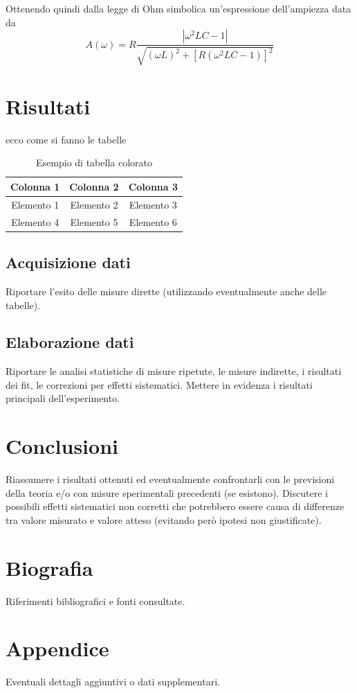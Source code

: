 \documentclass[12pt, letterpaper]{article}
\begin{document}
Ottenendo quindi dalla legge di Ohm simbolica un'espressione dell'ampiezza data da
\[
A(\omega)= R \frac{|\omega^2 LC -1|}{\sqrt{(\omega L)^2 + [R(\omega^2 LC -1)]^2}}
\]

\section{Risultati}

ecco come si fanno le tabelle

\begin{table}[htbp]
  \begin{tabular}{|c|c|c|}
    \hline
    Colonna 1 & Colonna 2 & Colonna 3 \\
    \hline
    Elemento 1 & Elemento 2 & Elemento 3 \\
    \hline
    Elemento 4 & Elemento 5 & Elemento 6 \\
    \hline
  \end{tabular}
   \textcolor{gray}{\caption{Esempio di tabella colorato }}
  \label{tab:esempio}
\end{table}

\subsection{Acquisizione dati}
Riportare l’esito delle misure dirette (utilizzando eventualmente anche
delle tabelle).

\subsection{Elaborazione dati}
Riportare le analisi statistiche di misure ripetute, le misure indirette, i
risultati dei fit, le correzioni per effetti sistematici. Mettere in evidenza i
risultati principali dell’esperimento.

\section{Conclusioni}
Riassumere i risultati ottenuti ed eventualmente confrontarli con le previsioni
della teoria e/o con misure sperimentali precedenti (se esistono).
Discutere i possibili effetti sistematici non corretti che potrebbero essere causa
di differenze tra valore misurato e valore atteso (evitando però ipotesi non
giustificate).

\section{Biografia}
Riferimenti bibliografici e fonti consultate.

\section{Appendice}
Eventuali dettagli aggiuntivi o dati supplementari.
\end{document}

